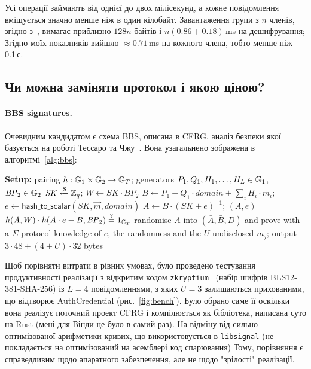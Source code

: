 Усі операції займають від однієї до двох мілісекунд, а кожне повідомлення вміщується значно менше ніж в один 
кілобайт. Завантаження групи з $n$ членів, згідно з~\cite{CPZ20}, вимагає приблизно $128n$ байтів і $n(0.86+0.18)$\,ms 
на дешифрування; Згідно моїх показників вийшло $\approx 0.71$\,ms на кожного члена, тобто менше ніж 0.1\,с.

\subsection{Чи можна заміняти протокол і якою ціною?}
\label{sec:alternatives}
\paragraph{BBS signatures.} Очевидним кандидатом є схема BBS, описана в CFRG\cite{BBSdraft}, аналіз безпеки якої 
базується на роботі Тессаро та Чжу~\cite{TZ23}. Вона узагальнено зображена в алгоритмі~\ref{alg:bbs}:

\newpage %
\begin{algorithm}[!ht]
  \caption{BBS signatures над ЕК BLS12-381 (спрощений вигляд з~\cite{BBSdraft})}
  \label{alg:bbs}
  \small
  \begin{algorithmic}[1]
    \Statex \textbf{Setup:} pairing $h:\mathbb{G}_1\times\mathbb{G}_2\to\mathbb{G}_T$; generators $P_1, Q_1, H_1,\dots,H_L\in\mathbb{G}_1$,
    $\mathit{BP}_2\in\mathbb{G}_2$
    \State $\mathit{SK}\xleftarrow{\$}\mathbb{Z}_q$; \quad $W \gets \mathit{SK}\cdot\mathit{BP}_2$ 
    \EndProcedure
    \State $B \gets P_1 + Q_1\cdot\mathit{domain} + \sum_{i} H_i\cdot m_i$; \quad
    $e \gets \mathsf{hash\_to\_scalar}(\mathit{SK}, \vec m, \mathit{domain})$
    \State $A \gets B\cdot (\mathit{SK}+e)^{-1}$; \quad \Return $(A,e)$ 
    \EndProcedure
    \State \Return $h(A, W)\cdot h(A\cdot e - B, \mathit{BP}_2) \overset{?}{=} 1_{\mathbb{G}_T}$
    \EndProcedure
    \State randomise $A$ into $(\bar A, \bar B, D)$ and prove with a $\Sigma$-protocol knowledge of $e$, the
    randomness and the $U$ undisclosed $m_j$; output $3\cdot 48 + (4+U)\cdot 32$ bytes
    \EndProcedure
  \end{algorithmic}
\end{algorithm}

Щоб порівняти витрати в рівних умовах, було проведено тестування продуктивності реалізації з відкритим кодом 
\texttt{zkryptium}~\cite{zkryptium} (набір шифрів BLS12-381-SHA-256) із $L=4$ повідомленнями, з яких $U=3$ залишаються 
прихованими, що відтворює AuthCredential (рис.~\ref{fig:bench}). Було обрано саме її оскільки вона реалізує поточний 
проект CFRG і компілюється як бібліотека, написана суто на Rust (мені для Вінди це було в самий раз). На відміну 
від сильно оптимізованої арифметики кривих, що використовується в \texttt{libsignal} (не покладається на 
оптимізований на асемблері код спарювання) Тому, порівняння є справедливим щодо апаратного забезпечення, 
але не щодо "зрілості"{} реалізації.

